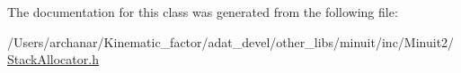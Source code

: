 The documentation for this class was generated from the following file\+:\begin{DoxyCompactItemize}
\item 
/\+Users/archanar/\+Kinematic\+\_\+factor/adat\+\_\+devel/other\+\_\+libs/minuit/inc/\+Minuit2/\mbox{\hyperlink{other__libs_2minuit_2inc_2Minuit2_2StackAllocator_8h}{Stack\+Allocator.\+h}}\end{DoxyCompactItemize}
